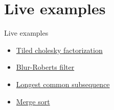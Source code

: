 \documentclass{beamer}
\begin{document}
  


  
  
    


    
    
      

\section{Live examples}

\begin{frame}{Live examples}
  \begin{itemize} 
    \item \href{https://maltezfaria.github.io/DataFlowTasks.jl/dev/examples/cholesky/cholesky/}{Tiled cholesky factorization}
    \item
    \href{https://maltezfaria.github.io/DataFlowTasks.jl/dev/examples/blur-roberts/blur-roberts/}{Blur-Roberts filter}
    \item
    \href{https://maltezfaria.github.io/DataFlowTasks.jl/dev/examples/lcs/lcs/}{Longest
    common subsequence}
    \item
    \href{https://maltezfaria.github.io/DataFlowTasks.jl/dev/examples/sort/sort/}{Merge sort}
  \end{itemize}
\end{frame}
\end{document}
